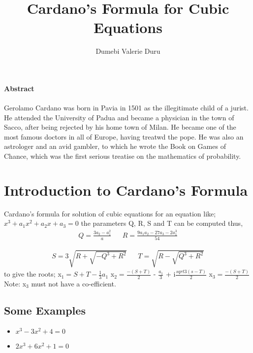 \documentclass{article}
\begin{document}
	
		\title{Cardano's Formula for Cubic Equations}
		\author{Dumebi Valerie Duru}
		\maketitle
	\begin{center}
		\textbf{Abstract}
	\end{center}
	\paragraph{}
		Gerolamo Cardano was born in Pavia in 1501 as the illegitimate child of a jurist. He attended the University of Padua and became a physician in the town of Sacco, after being rejected by his home town of Milan. He became one of the most famous doctors in all of Europe, having treatwd the pope. He was also an astrologer and an avid gambler, to which he wrote the Book on Games of Chance, which was the first serious treatise on the mathematics of probability. \cite{cardanoformula}
	
	\section{Introduction to Cardano's Formula}
		Cardano's formula for solution of cubic equations for an equation like;
		\newline
		\begin{math}
			x^{3} + a_{1}x^{2} + a_{2}x + a_{3} = 0
		\end{math}
		\newline
		the parameters Q, R, S and T can be computed thus, \newline
		\begin{align*}
			Q = \frac{3a_{2}-a_{1}^{2}}{a} &&
			R = \frac{9a_{1}a_{2}-27a_{3}-2a_{1}^{3}}{54}
		\end{align*}
	
		\begin{align*}
			S = 3 \sqrt{R + \sqrt{-Q^{3} + R^{2}}} && T= \sqrt{R-\sqrt{Q^{3}+R^{2}}}
		\end{align*}
			\newline	
			to give the roots;
			\newline
			x$_{1} = S + T- \frac{1}{3}a_{1}$
			\newline
			x$_{2} = \frac{-(S + T)}{2}$ - $\frac{a_{1}}{3}$ + i$\frac{sqrt{3}(s-T)}{2}$
			\newline
			x$_{3} = \frac{-(S+T)}{2}$
			\newline
			Note: x$_{3}$ must not have a co-efficient.
		
	\subsection{Some Examples}
	\begin{itemize}
		\item $x^{3} - 3x^{2} + 4 = 0$
		\item $2x^{3} + 6x^{2} + 1 = 0$
	\end{itemize}	
	
	
	
\end{document}
